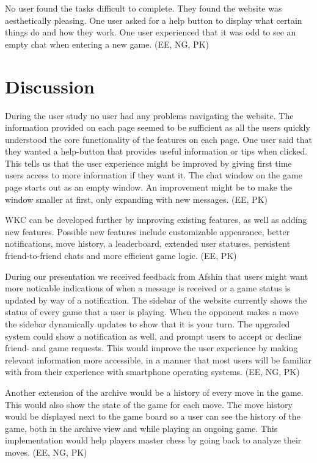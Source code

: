 \documentclass[acmlarge, review=false, screen=true]{acmart}
\begin{document}
    No user found the tasks difficult to complete. They found the website was aesthetically pleasing. One user asked for a help button to display what certain things do and how they work. One user experienced that it was odd to see an empty chat when entering a new game. (EE, NG, PK)



\section{Discussion}
  During the user study no user had any problems navigating the website. The information provided on each page seemed to be sufficient as all the users quickly understood the core functionality of the features on each page. One user said that they wanted a help-button that provides useful information or tips when clicked. This tells us that the user experience might be improved by giving first time users access to more information if they want it. The chat window on the game page starts out as an empty window. An improvement might be to make the window smaller at first, only expanding with new messages. (EE, PK)

  WKC can be developed further by improving existing features, as well as adding new features. Possible new features include customizable appearance, better notifications, move history, a leaderboard, extended user statuses, persistent friend-to-friend chats and more efficient game logic. (EE, PK)

  During our presentation we received feedback from Afshin that users might want more noticable indications of when a message is received or a game status is updated by way of a notification. The sidebar of the website currently shows the status of every game that a user is playing. When the opponent makes a move the sidebar dynamically updates to show that it is your turn. The upgraded system could show a notification as well, and prompt users to accept or decline friend- and game requests. This would improve the user experience by making relevant information more accessible, in a manner that most users will be familiar with from their experience with smartphone operating systems. (EE, NG, PK)

  Another extension of the archive would be a history of every move in the game. This would also show the state of the game for each move. The move history would be displayed next to the game board so a user can see the history of the game, both in the archive view and while playing an ongoing game. This implementation would help players master chess by going back to analyze their moves. (EE, NG, PK)
\end{document}
